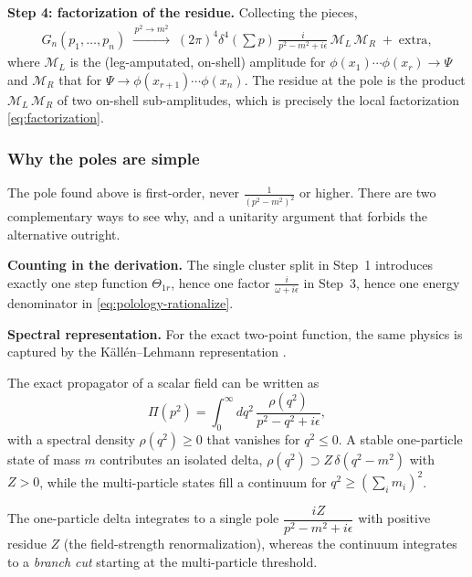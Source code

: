 \textbf{Step 4: factorization of the residue.} Collecting the pieces,
\begin{align}
	\label{eq:polology-factorization}
	G_n(p_1,\ldots,p_n)
	\;\xrightarrow{\,p^2 \to m^2\,}\;
	(2\pi)^4 \delta^4\!\left(\textstyle\sum p\right)\,
	\frac{i}{p^2 - m^2 + i\epsilon}\,
	\mathcal{M}_L\, \mathcal{M}_R
	\;+\; \text{extra},
\end{align}
where $\mathcal{M}_L$ is the (leg-amputated, on-shell) amplitude for $\phi(x_1)\cdots\phi(x_r) \to \Psi$ and $\mathcal{M}_R$ that for $\Psi \to \phi(x_{r+1})\cdots\phi(x_n)$. The residue at the pole is the product $\mathcal{M}_L\,\mathcal{M}_R$ of two on-shell sub-amplitudes, which is precisely the local factorization \eqref{eq:factorization}.


\subsubsection{Why the poles are simple}
\label{subsubsec:why-the-poles-are-simple}

The pole found above is first-order, never $\frac{1}{(p^2-m^2)^2}$ or higher. There are two complementary ways to see why, and a unitarity argument that forbids the alternative outright.

\textbf{Counting in the derivation.} The single cluster split in Step~1 introduces exactly one step function $\Theta_{1r}$, hence one factor $\frac{i}{\omega+i\epsilon}$ in Step~3, hence one energy denominator in \eqref{eq:polology-rationalize}. 

\textbf{Spectral representation.} For the exact two-point function, the same physics is captured by the K\"all\'en--Lehmann representation \autocite[\S24.2]{schwartzQFT2014}.

\begin{fact}
\label{fact:kallen-lehmann}
	The exact propagator of a scalar field can be written as
	\[
		\Pi(p^2) = \int_0^\infty dq^2\, \frac{\rho(q^2)}{p^2 - q^2 + i\epsilon},
	\]
	with a spectral density $\rho(q^2) \geq 0$ that vanishes for $q^2 \leq 0$. A stable one-particle state of mass $m$ contributes an isolated delta, $\rho(q^2) \supset Z\,\delta(q^2 - m^2)$ with $Z > 0$, while the multi-particle states fill a continuum for $q^2 \geq (\sum_i m_i)^2$.
\end{fact}

The one-particle delta integrates to a single pole $\dfrac{iZ}{p^2 - m^2 + i\epsilon}$ with positive residue $Z$ (the field-strength renormalization), whereas the continuum integrates to a \emph{branch cut} starting at the multi-particle threshold.

